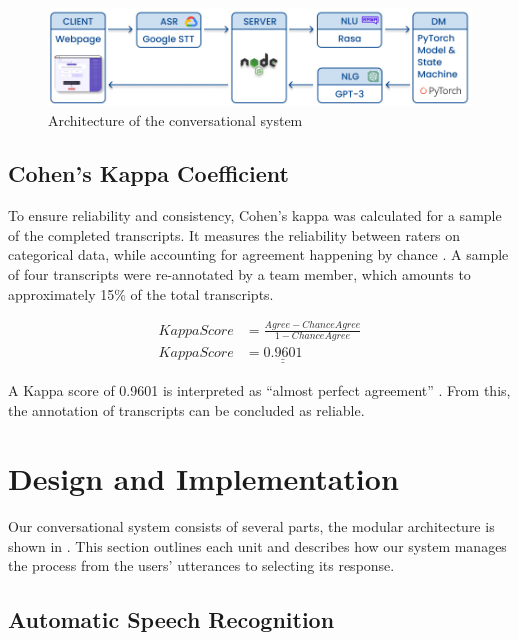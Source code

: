 \documentclass[hidelinks, 11pt]{article}
\begin{document}
\begin{figure}[h!]
  \includegraphics[width=\textwidth]{images/sys_graph.jpg}
  \caption{Architecture of the conversational system}
  \label{fig:system_architecture}
\end{figure}

\subsection{Cohen's Kappa Coefficient}
To ensure reliability and consistency, Cohen's kappa was calculated for a sample of the completed transcripts. It measures the reliability between raters on categorical data, while accounting for agreement happening by chance \cite{Cohen_1960}. A sample of four transcripts were re-annotated by a team member, which amounts to approximately 15\% of the total transcripts.

\begin{equation}
  \begin{split}
    KappaScore & = \frac{Agree - ChanceAgree}{1 - ChanceAgree} \\
    KappaScore & = \underline{\underline{0.9601}}
  \end{split}
\end{equation}

\noindent
A Kappa score of 0.9601 is interpreted as ``almost perfect agreement'' \cite{McHugh_2012}. From this, the annotation of transcripts can be concluded as reliable.


\section{Design and Implementation}
\label{sec:implementation}

Our conversational system consists of several parts, the modular architecture is shown in . This section outlines each unit and describes how our system manages the process from the users' utterances to selecting its response.

\subsection{Automatic Speech Recognition}
\label{subsec:asr}
\end{document}
